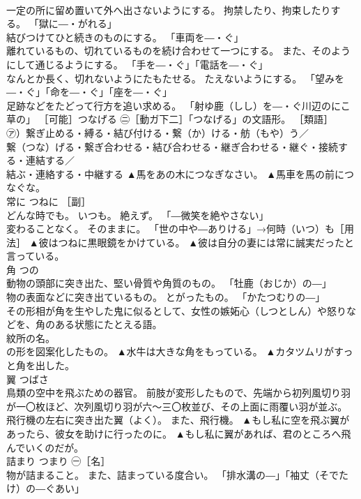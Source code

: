 \documentclass[8pt]{extreport}
\begin{document}
\begin{CJK}{UTF8}{min}
\\	一定の所に留め置いて外へ出さないようにする。 拘禁したり、拘束したりする。 「獄に―・がれる」 
\\	結びつけてひと続きのものにする。 「車両を―・ぐ」 
\\	離れているもの、切れているものを続け合わせて一つにする。 また、そのようにして通じるようにする。 「手を―・ぐ」「電話を―・ぐ」 
\\	なんとか長く、切れないようにたもたせる。 たえないようにする。 「望みを―・ぐ」「命を―・ぐ」「座を―・ぐ」 
\\	足跡などをたどって行方を追い求める。 「射ゆ鹿（しし）を―・ぐ川辺のにこ草の」 ［可能］つなげる ㊁［動ガ下二］「つなげる」の文語形。 ［類語］ 
\\	㋐）繋ぎ止める・縛る・結び付ける・繋（か）ける・舫（もや）う／
\\	繋（つな）げる・繋ぎ合わせる・結び合わせる・継ぎ合わせる・継ぐ・接続する・連結する／
\\	結ぶ・連絡する・中継する	▲馬をあの木につなぎなさい。 ▲馬車を馬の前につなぐな。
\\	常に	つねに	［副］ 
\\	どんな時でも。 いつも。 絶えず。 「―微笑を絶やさない」 
\\	変わることなく。 そのままに。 「世の中や―ありける」→何時（いつ）も［用法］	▲彼はつねに黒眼鏡をかけている。 ▲彼は自分の妻には常に誠実だったと言っている。
\\	角	つの	
\\	動物の頭部に突き出た、堅い骨質や角質のもの。 「牡鹿（おじか）の―」 
\\	物の表面などに突き出ているもの。 とがったもの。 「かたつむりの―」 
\\	その形相が角を生やした鬼に似るとして、女性の嫉妬心（しつとしん）や怒りなどを、角のある状態にたとえる語。 
\\	紋所の名。 
\\	の形を図案化したもの。	▲水牛は大きな角をもっている。 ▲カタツムリがすっと角を出した。
\\	翼	つばさ	
\\	鳥類の空中を飛ぶための器官。 前肢が変形したもので、先端から初列風切り羽が一〇枚ほど、次列風切り羽が六〜三〇枚並び、その上面に雨覆い羽が並ぶ。 
\\	飛行機の左右に突き出た翼（よく）。 また、飛行機。	▲もし私に空を飛ぶ翼があったら、彼女を助けに行ったのに。 ▲もし私に翼があれば、君のところへ飛んでいくのだが。
\\	詰まり	つまり	㊀［名］ 
\\	物が詰まること。 また、詰まっている度合い。 「排水溝の―」「袖丈（そでたけ）の―ぐあい」 

\end{CJK}
\end{document}
